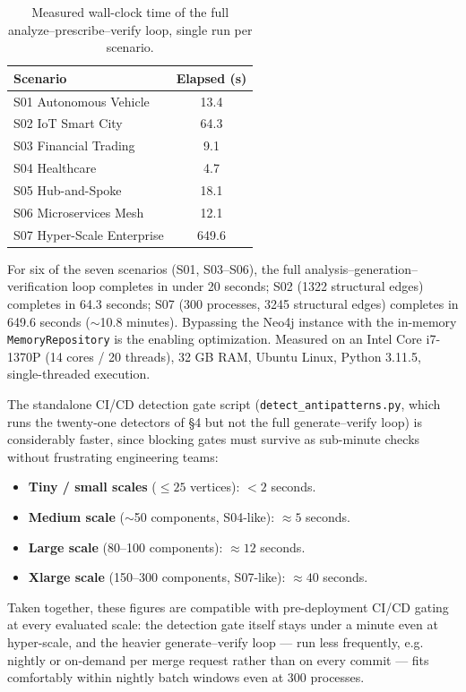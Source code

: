 \documentclass[11pt]{article}
\begin{document}
\begin{table}[htbp]
\centering
\caption{Measured wall-clock time of the full analyze--prescribe--verify loop, single run per scenario.}
\label{tab:runtime}
\begin{tabular}{@{}lc@{}}
\toprule
Scenario & Elapsed (s) \\
\midrule
S01 Autonomous Vehicle & 13.4 \\
S02 IoT Smart City & 64.3 \\
S03 Financial Trading & 9.1 \\
S04 Healthcare & 4.7 \\
S05 Hub-and-Spoke & 18.1 \\
S06 Microservices Mesh & 12.1 \\
S07 Hyper-Scale Enterprise & 649.6 \\
\bottomrule
\end{tabular}
\end{table}

For six of the seven scenarios (S01, S03--S06), the full analysis--generation--verification loop
completes in under 20 seconds; S02 (1322 structural edges) completes in 64.3 seconds; S07 (300
processes, 3245 structural edges) completes in 649.6 seconds ($\sim$10.8 minutes). Bypassing the Neo4j
instance with the in-memory \texttt{MemoryRepository} is the enabling optimization. Measured on an
Intel Core i7-1370P (14 cores / 20 threads), 32 GB RAM, Ubuntu Linux, Python 3.11.5, single-threaded
execution.

The standalone CI/CD detection gate script (\texttt{detect\_antipatterns.py}, which runs the
twenty-one detectors of \S4 but not the full generate--verify loop) is considerably faster, since
blocking gates must survive as sub-minute checks without frustrating engineering teams:

\begin{itemize}
\item \textbf{Tiny / small scales} ($\le 25$ vertices): $< 2$ seconds.
\item \textbf{Medium scale} ($\sim$50 components, S04-like): $\approx 5$ seconds.
\item \textbf{Large scale} (80--100 components): $\approx 12$ seconds.
\item \textbf{Xlarge scale} (150--300 components, S07-like): $\approx 40$ seconds.
\end{itemize}

Taken together, these figures are compatible with pre-deployment CI/CD gating at every evaluated
scale: the detection gate itself stays under a minute even at hyper-scale, and the heavier
generate--verify loop --- run less frequently, e.g. nightly or on-demand per merge request rather than
on every commit --- fits comfortably within nightly batch windows even at 300 processes.
\end{document}
